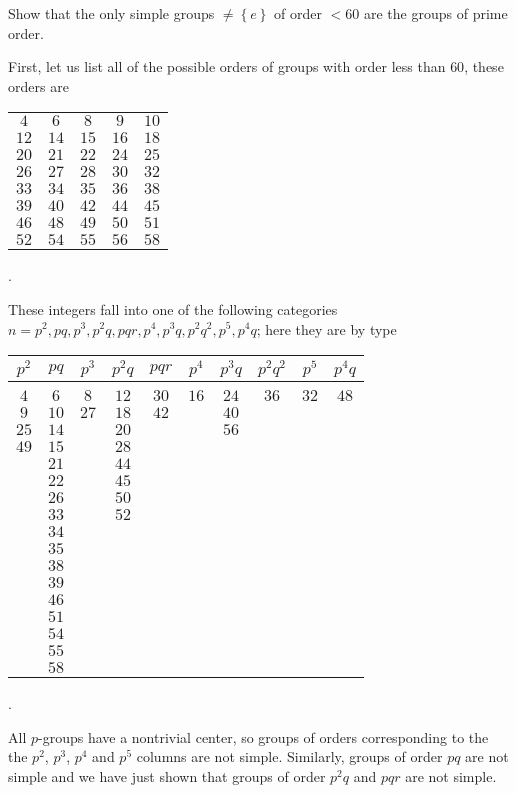 \begin{problem}
  Show that the only simple groups \(\neq\left\{e\right\}\) of order
  \(<60\) are the groups of prime order.
\end{problem}
\begin{solution}
  First, let us list all of the possible orders of groups with order less
  than \(60\), these orders are
  \begin{center}
    \begin{tabular}{ccccc}
      \(4\)&\(6\)&\(8\)&\(9\)&\(10\)\\
      \(12\)&\(14\)&\(15\)&\(16\)&\(18\)\\
      \(20\)&\(21\)&\(22\)&\(24\)&\(25\)\\
      \(26\)&\(27\)&\(28\)&\(30\)&\(32\)\\
      \(33\)&\(34\)&\(35\)&\(36\)&\(38\)\\
      \(39\)&\(40\)&\(42\)&\(44\)&\(45\)\\
      \(46\)&\(48\)&\(49\)&\(50\)&\(51\)\\
      \(52\)&\(54\)&\(55\)&\(56\)&\(58\)
    \end{tabular}.
  \end{center}
  These integers fall into one of the following categories
  \(n=p^2,pq,p^3,p^2q,pqr,p^4,p^3q,p^2q^2,p^5,p^4q\); here they are by type
  \begin{center}
    \begin{tabular}{cccccccccc}
      \(p^2\)&\(pq\)&\(p^3\)&\(p^2q\)&\(pqr\)&\(p^4\)&\(p^3q\)&\(p^2q^2\)&\(p^5\)&\(p^4q\)\\
      \hline\\
      \(4\)&\(6\)&\(8\)&\(12\)&\(30\)&\(16\)&\(24\)&\(36\)&\(32\)&\(48\)\\
      \(9\)&\(10\)&\(27\)&\(18\)&\(42\)&&\(40\)\\
      \(25\)&\(14\)&&\(20\)&&&\(56\)\\
      \(49\)&\(15\)&&\(28\)\\
      &\(21\)&&\(44\)\\
      &\(22\)&&\(45\)\\
      &\(26\)&&\(50\)\\
      &\(33\)&&\(52\)\\
      &\(34\)\\
      &\(35\)\\
      &\(38\)\\
      &\(39\)\\
      &\(46\)\\
      &\(51\)\\
      &\(54\)\\
      &\(55\)\\
      &\(58\)\\
    \end{tabular}.
  \end{center}
  All \(p\)-groups have a nontrivial center, so groups of orders
  corresponding to the the \(p^2\), \(p^3\), \(p^4\) and \(p^5\) columns
  are not simple. Similarly, groups of order \(pq\) are not simple and we
  have just shown that groups of order \(p^2q\) and \(pqr\) are not simple.


\end{solution}
